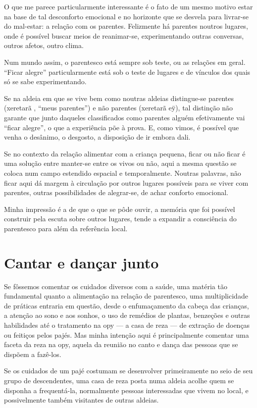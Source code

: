 O que me parece particularmente interessante é o fato de um mesmo motivo
estar na base de tal desconforto emocional e no horizonte que se
desvela para livrar-se do mal-estar: a relação com os parentes.
Felizmente há parentes noutros lugares, onde é possível buscar meios de
reanimar-se, experimentando outras conversas, outros afetos, outro
clima. 

Num mundo assim, o parentesco está sempre sob teste, ou as relações em
geral. ``Ficar alegre'' particularmente está sob o teste de lugares e de
vínculos dos quais só se sabe experimentando. 

Se na aldeia em que se vive bem como noutras aldeias distingue-se
parentes (xeretarã , ``meus parentes'') e não parentes (xeretarã eÿ), tal
distinção não garante que junto daqueles classificados como parentes
alguém efetivamente vai ``ficar alegre'', o que a experiência põe à
prova. E, como vimos, é possível que venha o desânimo, o desgosto, a
disposição de ir embora dali.

Se no contexto da relação alimentar com a criança pequena, ficar ou não
ficar é uma solução entre manter-se entre os vivos ou não, aqui a mesma
questão se coloca num campo estendido espacial e temporalmente. Noutras
palavras, não ficar aqui dá margem à circulação por outros lugares
possíveis para se viver com parentes, outras possibilidades de
alegrar-se, de achar conforto emocional. 

Minha impressão é a de que o que se pôde ouvir, a memória que foi
possível construir pela escuta sobre outros lugares, tende a expandir a
consciência do parentesco para além da referência local. 

\section{Cantar e dançar junto}

Se fôssemos comentar os cuidados diversos com a saúde, uma matéria tão
fundamental quanto a alimentação na relação de parentesco, uma
multiplicidade de práticas entraria em questão, desde o enfumaçamento
da cabeça das crianças, a atenção ao sono e aos sonhos, o uso de
remédios de plantas, benzeções e outras habilidades até o tratamento na
opy --- a casa de reza --- de extração de doenças ou feitiços pelos pajés.
Mas minha intenção aqui é principalmente comentar uma faceta da reza na
opy, aquela da reunião no canto e dança das pessoas que se dispõem a
fazê-los.

Se os cuidados de um pajé costumam se desenvolver primeiramente no seio
de seu grupo de descendentes, uma casa de reza posta numa aldeia acolhe
quem se disponha a frequentá-la, normalmente pessoas interessadas que
vivem no local, e possivelmente também visitantes de outras aldeias.

